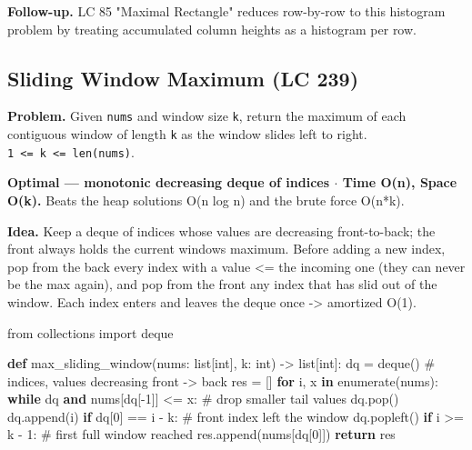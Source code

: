 \documentclass[11pt]{article}
\newenvironment{Shaded}{\begin{snugshade}}{\end{snugshade}}
\newcommand{\BuiltInTok}[1]{\textcolor[rgb]{0.50,0.55,0.55}{#1}}
\newcommand{\CommentTok}[1]{\textcolor[rgb]{0.48,0.49,0.49}{#1}}
\newcommand{\ControlFlowTok}[1]{\textcolor[rgb]{0.99,0.74,0.29}{\textbf{#1}}}
\newcommand{\DecValTok}[1]{\textcolor[rgb]{0.96,0.45,0.00}{#1}}
\newcommand{\ImportTok}[1]{\textcolor[rgb]{0.15,0.68,0.38}{#1}}
\newcommand{\KeywordTok}[1]{\textcolor[rgb]{0.81,0.81,0.76}{\textbf{#1}}}
\newcommand{\NormalTok}[1]{\textcolor[rgb]{0.81,0.81,0.76}{#1}}
\newcommand{\OperatorTok}[1]{\textcolor[rgb]{0.81,0.81,0.76}{#1}}
\begin{document}
\textbf{Follow-up.} LC 85 "Maximal Rectangle" reduces row-by-row to this histogram problem by treating accumulated column heights as a histogram per row.

\subsection{Sliding Window Maximum (LC 239)}\label{sliding-window-maximum-lc-239}

\textbf{Problem.} Given \texttt{nums} and window size \texttt{k}, return the maximum of each contiguous window of length \texttt{k} as the window slides left to right. \texttt{1\ \textless{}=\ k\ \textless{}=\ len(nums)}.

\textbf{Optimal --- monotonic decreasing deque of indices \(\cdot\) Time O(n), Space O(k).} Beats the heap solution\textquotesingle s O(n log n) and the brute force O(n*k).

\textbf{Idea.} Keep a deque of indices whose values are decreasing front-to-back; the front always holds the current window\textquotesingle s maximum. Before adding a new index, pop from the back every index with a value \textless= the incoming one (they can never be the max again), and pop from the front any index that has slid out of the window. Each index enters and leaves the deque once -\textgreater{} amortized O(1).


\begin{Shaded}
\begin{Highlighting}[]
\ImportTok{from}\NormalTok{ collections }\ImportTok{import}\NormalTok{ deque}

\KeywordTok{def}\NormalTok{ max\_sliding\_window(nums: }\BuiltInTok{list}\NormalTok{[}\BuiltInTok{int}\NormalTok{], k: }\BuiltInTok{int}\NormalTok{) }\OperatorTok{{-}\textgreater{}} \BuiltInTok{list}\NormalTok{[}\BuiltInTok{int}\NormalTok{]:}
\NormalTok{    dq }\OperatorTok{=}\NormalTok{ deque()    }\CommentTok{\# indices, values decreasing front {-}\textgreater{} back}
\NormalTok{    res }\OperatorTok{=}\NormalTok{ []}
    \ControlFlowTok{for}\NormalTok{ i, x }\KeywordTok{in} \BuiltInTok{enumerate}\NormalTok{(nums):}
        \ControlFlowTok{while}\NormalTok{ dq }\KeywordTok{and}\NormalTok{ nums[dq[}\OperatorTok{{-}}\DecValTok{1}\NormalTok{]] }\OperatorTok{\textless{}=}\NormalTok{ x:    }\CommentTok{\# drop smaller tail values}
\NormalTok{            dq.pop()}
\NormalTok{        dq.append(i)}
        \ControlFlowTok{if}\NormalTok{ dq[}\DecValTok{0}\NormalTok{] }\OperatorTok{==}\NormalTok{ i }\OperatorTok{{-}}\NormalTok{ k:                 }\CommentTok{\# front index left the window}
\NormalTok{            dq.popleft()}
        \ControlFlowTok{if}\NormalTok{ i }\OperatorTok{\textgreater{}=}\NormalTok{ k }\OperatorTok{{-}} \DecValTok{1}\NormalTok{:                     }\CommentTok{\# first full window reached}
\NormalTok{            res.append(nums[dq[}\DecValTok{0}\NormalTok{]])}
    \ControlFlowTok{return}\NormalTok{ res}
\end{Highlighting}
\end{Shaded}
\end{document}
